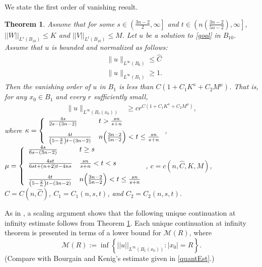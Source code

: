 \documentclass[11pt]{amsart}
\theoremstyle{plain}
\newtheorem{theorem}{Theorem}
\numberwithin{equation}{section}
\begin{document}
We state the first order of vanishing result.

\begin{theorem}
Assume that for some $s \in {\left( {\frac{3n-2}{2}, {\infty}} \right] }$ and $t \in
{\left( { n{\left( {\frac{3n-2}{5n-2}} \right) }, {\infty}} \right] }$, ${\left\vert\left\vert {W}\right\vert\right\vert}_{L^s{\left( {B_{10}} \right) }} \le
K$ and ${\left\vert\left\vert {V}\right\vert\right\vert}_{L^t{\left( {B_{10}} \right) }} \le M$. Let $u$ be a solution to
\eqref{goal} in $B_{10}$. Assume that $u$ is bounded and normalized as follows:
\begin{align}
& \|u\|_{L^\infty(B_{6})}\leq \hat{C}
\label{bound} \\
& \|u\|_{L^\infty(B_{1})}\geq 1.
\label{normal}
\end{align}
Then the vanishing order of $u$ in  $B_{1}$ is less than $C{\left( {1 +
C_1 K^\kappa + C_2 M^\mu} \right) }$. That is, for any $x_0\in B_1$ and every
$r$ sufficiently small,
\begin{align*}
\|u\|_{L^{\infty}(B_{r}(x_0))}
 &\ge c r^{C{\left( {1 + C_1 K^\kappa + C_2 M^\mu} \right) }},
\end{align*}
where
${\displaystyle} \kappa = \left\{\begin{array}{ll}
\frac{4s}{2s - {\left( {3n-2} \right) }} & t > \frac{sn}{s+n} \medskip \\
\frac{4t}{{\left( {5 - \frac 2 n} \right) }t - {\left( {3n-2} \right) }} & n{\left( {\frac{3n-2}{5n-2}} \right) }
< t \le \frac{sn}{s+n}
\end{array}\right.$,
${\displaystyle} \mu = \left\{\begin{array}{ll}
\frac{4s}{6s - {\left( {3n-2} \right) }} & t \ge s \medskip \\
\frac{4 s t}{6 s t + {\left( {n+2} \right) }t -4ns} & \frac{sn}{s+n} < t < s \medskip \\
\frac{4t}{{\left( {5 - \frac 2 n} \right) }t - {\left( {3n-2} \right) }} & n{\left( {\frac{3n-2}{5n-2}} \right) }
< t \le \frac{sn}{s+n}
\end{array}\right.$,
$c = c{\left( {n, \hat C, K, M} \right) }$, $C = C{\left( {n, \hat C} \right) }$, $C_1 = C_1{\left( {n,
s, t} \right) }$, and $C_2 = C_2{\left( {n, s, t} \right) }$. \label{thh}
\end{theorem}

As in \cite{BK05}, a scaling argument shows that the following unique continuation at infinity estimate follows from Theorem \ref{thh}.
Each unique continuation at infinity theorem is presented in terms of a lower bound for $\mathcal{M}{\left( {R} \right) }$, where
\begin{equation}
\mathcal{M}{\left( {R} \right) } := \inf{\left\{{{\left\vert\left\vert {u}\right\vert\right\vert}_{L^{\infty}{\left( {B_1{\left( {x_0} \right) }} \right) }} : {\left\vert{x_0}\right\vert} = R}\right\}}.
\label{MRDef}
\end{equation}
(Compare with Bourgain and Kenig's estimate given in \eqref{quantEst}.)
\end{document}
